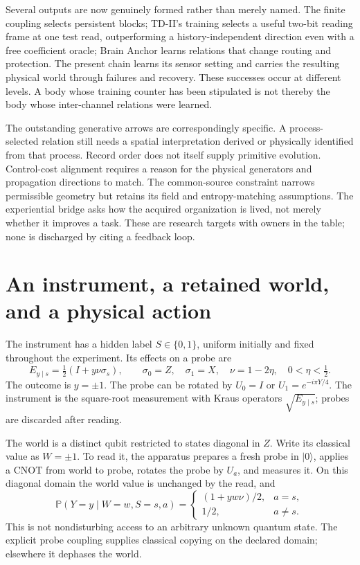 \documentclass[11pt,a4paper]{article}
\newcommand{\Prb}{\mathbb P}
\begin{document}
Several outputs are now genuinely formed rather than merely named.
The finite coupling selects persistent blocks; TD-II's training
selects a useful two-bit reading frame at one test read, outperforming
a history-independent direction even with a free coefficient oracle;
Brain Anchor learns
relations that change routing and protection. The present chain learns
its sensor setting and carries the resulting physical world through
failures and recovery. These successes occur at different levels.
A body whose training counter has been stipulated is not thereby the
body whose inter-channel relations were learned.

The outstanding generative arrows are correspondingly specific.
A process-selected relation still needs a spatial interpretation
derived or physically identified from that process. Record order does
not itself supply primitive evolution. Control-cost alignment requires
a reason for the physical generators and propagation directions to
match. The common-source constraint narrows permissible geometry but
retains its field and entropy-matching assumptions. The experiential
bridge asks how the acquired organization is lived, not merely whether
it improves a task. These are research targets with owners in the
table; none is discharged by citing a feedback loop.

\section{An instrument, a retained world, and a physical action}
\label{sec:model}

The instrument has a hidden label $S\in\{0,1\}$, uniform initially and fixed throughout the experiment. Its effects on a probe are
\begin{equation}\label{eq:instrument}
 E_{y\mid s}=\tfrac12(I+y\nu\sigma_s),\qquad
 \sigma_0=Z,\quad\sigma_1=X,\quad
 \nu=1-2\eta,\quad 0<\eta<\tfrac12.
\end{equation}
The outcome is $y=\pm1$. The probe can be rotated by $U_0=I$ or $U_1=e^{-i\pi Y/4}$. The instrument is the square-root measurement with Kraus operators $\sqrt{E_{y\mid s}}$; probes are discarded after reading.

The world is a distinct qubit restricted to states diagonal in $Z$. Write its classical value as $W=\pm1$. To read it, the apparatus prepares a fresh probe in $|0\rangle$, applies a CNOT from world to probe, rotates the probe by $U_a$, and measures it. On this diagonal domain the world value is unchanged by the read, and
\begin{equation}\label{eq:law}
 \Prb(Y=y\mid W=w,S=s,a)=
 \begin{cases}(1+yw\nu)/2,&a=s,\\1/2,&a\ne s.\end{cases}
\end{equation}
This is not nondisturbing access to an arbitrary unknown quantum state. The explicit probe coupling supplies classical copying on the declared domain; elsewhere it dephases the world.
\end{document}
